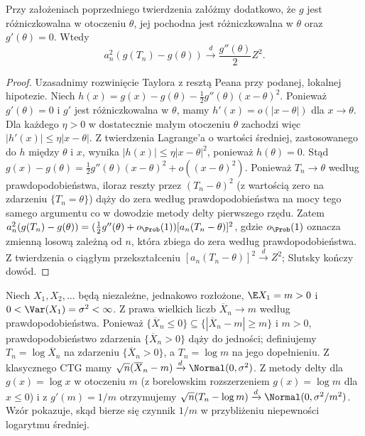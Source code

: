 \begin{wniosek}
Przy założeniach poprzedniego twierdzenia załóżmy
dodatkowo, że $g$ jest różniczkowalna w otoczeniu $\theta$,
jej pochodna jest różniczkowalna w $\theta$ oraz
$g'(\theta)=0$.
Wtedy
\[
a_n^2(g(T_n)-g(\theta))
\xrightarrow d\frac{g''(\theta)}2Z^2.
\]
\end{wniosek}
\begin{proof}
Uzasadnimy rozwinięcie Taylora z resztą Peana
przy podanej, lokalnej hipotezie. Niech
$h(x)=g(x)-g(\theta)-\frac12g''(\theta)(x-\theta)^2$.
Ponieważ $g'(\theta)=0$ i $g'$ jest różniczkowalna
w $\theta$, mamy $h'(x)=o(|x-\theta|)$ dla $x\to\theta$.
Dla każdego $\eta>0$ w dostatecznie małym otoczeniu
$\theta$ zachodzi więc $|h'(x)|\leq\eta|x-\theta|$.
Z twierdzenia Lagrange'a o wartości średniej,
zastosowanego do $h$ między $\theta$ i $x$, wynika
$|h(x)|\leq\eta|x-\theta|^2$, ponieważ $h(\theta)=0$.
Stąd
$g(x)-g(\theta)=\frac12g''(\theta)(x-\theta)^2
+o((x-\theta)^2)$. Ponieważ $T_n\to\theta$
według prawdopodobieństwa, iloraz reszty przez
$(T_n-\theta)^2$ (z wartością zero na zdarzeniu
$\{T_n=\theta\}$) dąży do zera według prawdopodobieństwa
na mocy tego samego argumentu co w dowodzie
metody delty pierwszego rzędu.
Zatem
$a_n^2(g(T_n)-g(\theta))
=(\frac12g''(\theta)+o_{\Prob}(1))
[a_n(T_n-\theta)]^2$,
gdzie $o_{\Prob}(1)$ oznacza zmienną losową zależną od $n$,
która zbiega do zera według prawdopodobieństwa.
Z twierdzenia o ciągłym przekształceniu
$[a_n(T_n-\theta)]^2\xrightarrow d Z^2$;
Slutsky kończy dowód.
\end{proof}

\begin{przyklad}
Niech $X_1,X_2,\ldots$ będą niezależne, jednakowo
rozłożone, $\E X_1=m>0$ i
$0<\Var(X_1)=\sigma^2<\infty$.
Z prawa wielkich liczb $\overline X_n\to m$
według prawdopodobieństwa. Ponieważ
$\{\overline X_n\leq0\}\subseteq
\{|\overline X_n-m|\geq m\}$ i $m>0$,
prawdopodobieństwo zdarzenia $\{\overline X_n>0\}$
dąży do jedności;
definiujemy $T_n=\log\overline X_n$ na zdarzeniu
$\{\overline X_n>0\}$, a $T_n=\log m$ na jego dopełnieniu.
Z klasycznego CTG mamy
$\sqrt n(\overline X_n-m)\xrightarrow d\Normal(0,\sigma^2)$.
Z metody delty dla $g(x)=\log x$ w otoczeniu $m$
(z borelowskim rozszerzeniem
$g(x)=\log m$ dla $x\leq0$) i z $g'(m)=1/m$
otrzymujemy
$\sqrt n(T_n-\log m)\xrightarrow d
\Normal(0,\sigma^2/m^2)$.
Wzór pokazuje, skąd bierze się czynnik $1/m$
w przybliżeniu niepewności logarytmu średniej.
\end{przyklad}

